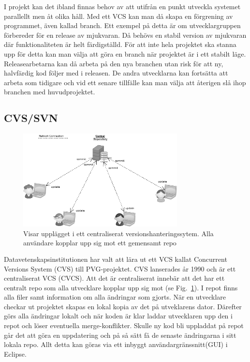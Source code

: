 I projekt kan det ibland finnas behov av att utifrån en punkt utveckla systemet parallellt men åt olika håll. Med ett VCS kan man då skapa en förgrening av programmet, även kallad branch. Ett exempel på detta är om utvecklargruppen förbereder för en release av mjukvaran. Då behövs en stabil version av mjukvaran där funktionaliteten är helt färdigställd. För att inte hela projektet ska stanna upp för detta kan man välja att göra en branch när projektet är i ett stabilt läge. Releasearbetarna kan då arbeta på den nya branchen utan risk för att ny, halvfärdig kod följer med i releasen. De andra utvecklarna kan fortsätta att arbeta som tidigare och vid ett senare tillfälle kan man välja att återigen slå ihop branchen med huvudprojektet.


\subsection{CVS/SVN}

\begin{figure}[htb!]\centering\includegraphics[width=0.75\textwidth]{CVCS.png}\caption{Visar upplägget i ett centraliserat versionshanteringssytem. Alla användare kopplar upp sig mot ett gemensamt repo}\label{fig:CVCSPic}\end{figure}



Datavetenskapsinstitutionen har valt att lära ut ett VCS kallat Concurrent Versions System (CVS) till PVG-projektet. CVS lanserades år 1990 och är ett centraliserat VCS (CVCS). Att det är centraliserat innebär att det har ett centralt repo som alla utvecklare kopplar upp sig mot (se Fig.~\ref{fig:CVCSPic}). I repot finns alla filer samt information om alla ändringar som gjorts. När en utvecklare checkar ut projektet skapas en lokal kopia av det på utveklarens dator. Därefter görs alla ändringar lokalt och när koden är klar laddar utvecklaren upp den i repot och löser eventuella merge-konflikter. Skulle ny kod bli uppladdat på repot går det att göra en uppdatering och på så sätt få de senaste ändringarna i sitt lokala repo. Allt detta kan göras via ett inbyggt användargränssnitt(GUI) i Eclipse. 

